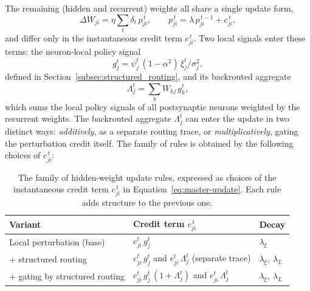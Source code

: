     The remaining (hidden and recurrent) weights all share a single update form,
    \begin{equation}
    \Delta W_{ji} = \eta \sum_t \delta_t\, p_{ji}^{\,t},
    \qquad
    p_{ji}^{\,t} = \lambda\, p_{ji}^{\,t-1} + c_{ji}^{\,t},
    \label{eq:master-update}
    \end{equation}
    and differ only in the instantaneous credit term $c_{ji}^{\,t}$. Two local
    signals enter these terms: the neuron-local policy signal
    \begin{equation}
    g_j^t = \psi_j^t\,(1-\alpha^2)\,\xi_j^t / \sigma_j^2,
    \label{eq:local-policy-signal}
    \end{equation}
    defined in Section~\ref{subsec:structured_routing}, and its backrouted
    aggregate
    \begin{equation}
    \Lambda_j^t = \sum_k W_{kj}\, g_k^t,
    \label{eq:backrouted-aggregate}
    \end{equation}
    which sums the local policy signals of all postsynaptic neurons weighted by the
    recurrent weights. The backrouted aggregate $\Lambda_j^t$ can enter the update
    in two distinct ways: \emph{additively}, as a separate routing trace, or
    \emph{multiplicatively}, gating the perturbation credit itself. The family of
    rules is obtained by the following choices of $c_{ji}^{\,t}$:
    
    \begin{table}[h]
    \centering
    \renewcommand{\arraystretch}{1.6}
    \begin{tabular}{@{}lll@{}}
    \toprule
    \textbf{Variant} & \textbf{Credit term $c_{ji}^{\,t}$} & \textbf{Decay} \\
    \midrule
    Local perturbation (base)
      & $e_{ji}^t\, g_j^t$
      & $\lambda_\xi$ \\
    \addlinespace
    + structured routing
      & $e_{ji}^t\, g_j^t$ \; and \; $e_{ji}^t\, \Lambda_j^t$ \;(separate trace)
      & $\lambda_\xi,\ \lambda_L$ \\
    \addlinespace
    + gating by structured routing
      & $e_{ji}^t\, g_j^t\,(1 + \Lambda_j^t)$ \; and \; $e_{ji}^t\, \Lambda_j^t$
      & $\lambda_\xi,\ \lambda_L$ \\
    \bottomrule
    \end{tabular}
    \caption{The family of hidden-weight update rules, expressed as choices of the
    instantaneous credit term $c_{ji}^{\,t}$ in Equation~\eqref{eq:master-update}.
    Each rule adds structure to the previous one.}
    \label{tab:update-variants}
    \end{table}
    
